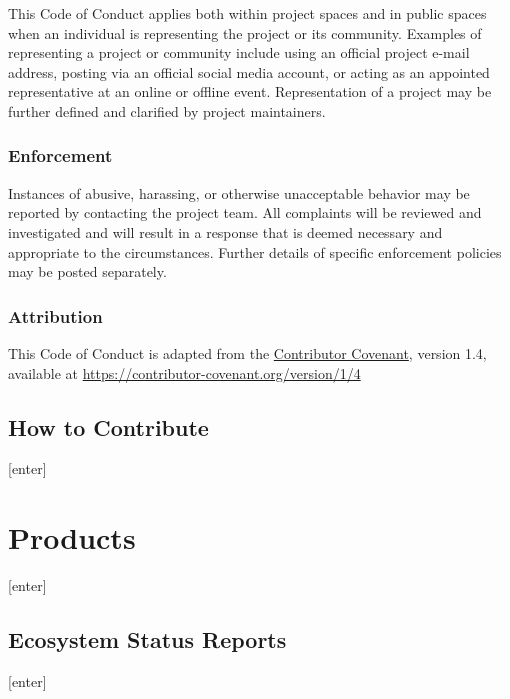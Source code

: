 \documentclass[
  letterpaper,
  oneside,
  open=any]{scrbook}
\begin{document}
This Code of Conduct applies both within project spaces and in public
spaces when an individual is representing the project or its community.
Examples of representing a project or community include using an
official project e-mail address, posting via an official social media
account, or acting as an appointed representative at an online or
offline event. Representation of a project may be further defined and
clarified by project maintainers.

\hypertarget{enforcement}{%
\section{Enforcement}\label{enforcement}}

Instances of abusive, harassing, or otherwise unacceptable behavior may
be reported by contacting the project team. All complaints will be
reviewed and investigated and will result in a response that is deemed
necessary and appropriate to the circumstances. Further details of
specific enforcement policies may be posted separately.

\hypertarget{attribution}{%
\section{Attribution}\label{attribution}}

This Code of Conduct is adapted from the
\href{https://contributor-covenant.org}{Contributor Covenant}, version
1.4, available at
\href{https://contributor-covenant.org/version/1/4/}{https://contributor-covenant.org/version/1/4}

\hypertarget{how-to-contribute}{%
\chapter{How to Contribute}\label{how-to-contribute}}

{[}enter{]}

\part{Products}

{[}enter{]}

\hypertarget{ecosystem-status-reports}{%
\chapter{Ecosystem Status Reports}\label{ecosystem-status-reports}}

{[}enter{]}
\end{document}
